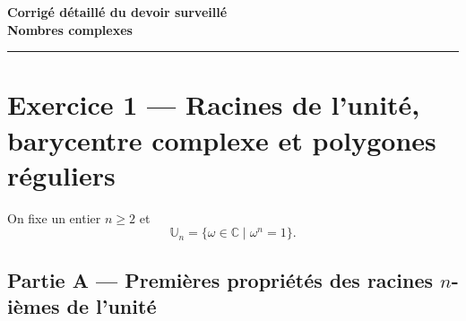 \documentclass[11pt,a4paper]{article}
\newcommand{\C}{\mathbb{C}}
\newcommand{\U}{\mathbb{U}}
\begin{document}
\begin{center}
    {\LARGE \textbf{Corrigé détaillé du devoir surveillé}}\\[0.4em]
    {\Large \textbf{Nombres complexes}}\\[0.6em]
    \rule{0.9\linewidth}{0.6pt}
\end{center}

\section*{Exercice 1 --- Racines de l’unité, barycentre complexe et polygones réguliers}

On fixe un entier \(n\ge 2\) et
\[
\U_n=\{\omega\in\C\mid \omega^n=1\}.
\]

\subsection*{Partie A --- Premières propriétés des racines \(n\)-ièmes de l’unité}
\end{document}
